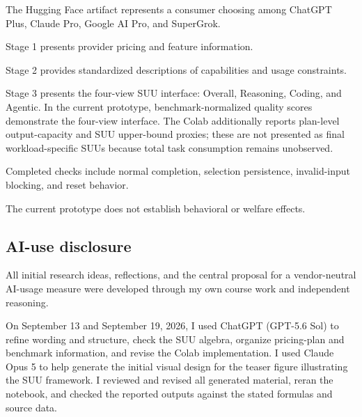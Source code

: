 \documentclass[sigconf,nonacm]{acmart}
\begin{document}
The Hugging Face artifact represents a consumer choosing among
ChatGPT Plus,
Claude Pro,
Google AI Pro,
and SuperGrok.

\vspace{0.4em}

Stage 1 presents provider pricing and feature information.

\vspace{0.25em}

Stage 2 provides standardized descriptions of capabilities and usage
constraints.

\vspace{0.25em}

Stage 3 presents the four-view SUU interface:
Overall, Reasoning, Coding, and Agentic.
In the current prototype, benchmark-normalized quality scores demonstrate the
four-view interface. The Colab additionally reports plan-level output-capacity
and SUU upper-bound proxies; these are not presented as final workload-specific
SUUs because total task consumption remains unobserved.

\vspace{0.4em}

Completed checks include
normal completion,
selection persistence,
invalid-input blocking,
and reset behavior.

The current prototype does not establish behavioral or welfare effects.


\subsection{AI-use disclosure}

All initial research ideas,
reflections,
and the central proposal for a vendor-neutral AI-usage measure were developed
through my own course work and independent reasoning.

\vspace{0.5em}

On September 13 and September 19, 2026,
I used ChatGPT (GPT-5.6 Sol) to refine wording and structure, check the SUU
algebra, organize pricing-plan and benchmark information, and revise the Colab
implementation. I used Claude Opus 5 to help generate the initial visual design
for the teaser figure illustrating the SUU framework. I reviewed and revised
all generated material, reran the notebook, and checked the reported outputs
against the stated formulas and source data.

\vspace{0.5em}
\end{document}
